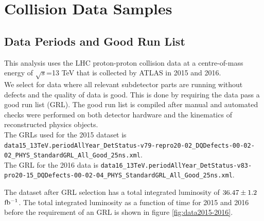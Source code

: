 \chapter{Collision Data Samples}
\label{chap:data}
\section{Data Periods and Good Run List}
\label{EventSel:GRL}

\indent This analysis uses the LHC proton-proton collision data at a centre-of-mass energy of $\sqrt{s}$=13 TeV that is collected by ATLAS in 2015 and 2016. \\

\indent We select for data where all relevant subdetector parts are running without defects and the quality of data is good.  This is done by requiring the data pass a good run list (GRL).  The good run list is compiled after manual and automated checks were performed on both detector hardware and the kinematics of reconstructed physics objects.  \\

\indent The GRLs used for the 2015 dataset is {\tt \scriptsize data15\_13TeV.periodAllYear\_DetStatus-v79-repro20-02\_DQDefects-00-02-02\_PHYS\_StandardGRL\_All\_Good\_25ns.xml}.  \\
\indent The GRL for the 2016 data is {\tt \scriptsize data16\_13TeV.periodAllYear\_DetStatus-v83-pro20-15\_DQDefects-00-02-04\_PHYS\_StandardGRL\_All\_Good\_25ns.xml}.

\indent The dataset after GRL selection has a total integrated luminosity of $36.47 \pm 1.2$ $\mbox{fb$^{-1}$}$.  The total integrated luminosity as a function of time for 2015 and 2016 before the requirement of an GRL is shown in figure \ref{fig:data2015-2016}.\\


